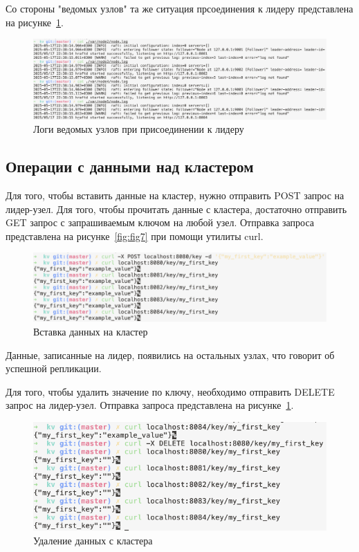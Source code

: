 Со стороны "ведомых узлов" та же ситуация прсоединения к лидеру представлена на рисунке~\ref{fig:fig8}.

\begin{figure}
  \centering
  \includegraphics[scale=0.35]{assets/follower_join_logs.png}
  \caption{Логи ведомых узлов при присоединении к лидеру}
  \label{fig:fig8}
\end{figure}

\subsection{Операции с данными над кластером}

Для того, чтобы вставить данные на кластер, нужно отправить POST запрос на лидер-узел. Для того, чтобы прочитать данные с кластера, достаточно отправить GET
запрос с запрашиваемым ключом на любой узел. Отправка запроса представлена на рисунке~\ref{fig:fig7} при помощи утилиты curl.

\begin{figure}
  \centering
  \includegraphics[scale=0.5]{assets/insert.png}
  \caption{Вставка данных на кластер}
  \label{fig:fig9}
\end{figure}

Данные, записанные на лидер, появились на остальных узлах, что говорит об успешной репликации.

Для того, чтобы удалить значение по ключу, необходимо отправить DELETE запрос на лидер-узел. Отправка запроса представлена на рисунке~\ref{fig:fig8}.

\begin{figure}
  \centering
  \includegraphics[scale=0.5]{assets/delete.png}
  \caption{Удаление данных с кластера}
  \label{fig:fig10}
\end{figure}

